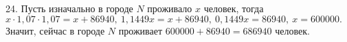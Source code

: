 24. Пусть изначально в городе $N$ проживало $x$ человек, тогда $x\cdot1,07\cdot1,07=x+86940,\ 1,1449x=x+86940,\ 0,1449x=86940,\ x=600000.$ Значит, сейчас в городе $N$ проживает $600000+86940=686940$ человек.\\
